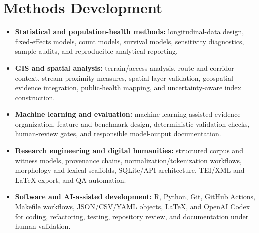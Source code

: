 \documentclass[10.5pt,letterpaper]{article}
\begin{document}
\section*{Methods Development}
\begin{itemize}
    \item \textbf{Statistical and population-health methods:} longitudinal-data design, fixed-effects models, count models, survival models, sensitivity diagnostics, sample audits, and reproducible analytical reporting.
    \item \textbf{GIS and spatial analysis:} terrain/access analysis, route and corridor context, stream-proximity measures, spatial layer validation, geospatial evidence integration, public-health mapping, and uncertainty-aware index construction.
    \item \textbf{Machine learning and evaluation:} machine-learning-assisted evidence organization, feature and benchmark design, deterministic validation checks, human-review gates, and responsible model-output documentation.
    \item \textbf{Research engineering and digital humanities:} structured corpus and witness models, provenance chains, normalization/tokenization workflows, morphology and lexical scaffolds, SQLite/API architecture, TEI/XML and LaTeX export, and QA automation.
    \item \textbf{Software and AI-assisted development:} R, Python, Git, GitHub Actions, Makefile workflows, JSON/CSV/YAML objects, LaTeX, and OpenAI Codex for coding, refactoring, testing, repository review, and documentation under human validation.
\end{itemize}
\end{document}
